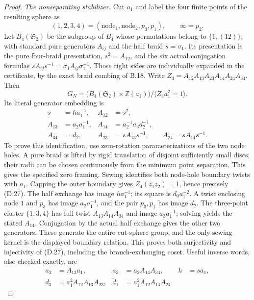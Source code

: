 \begin{proof}
\emph{The nonseparating stabilizer.}
Cut $a_1$ and label the four finite points of the resulting
sphere as
\[
         (1,2,3,4)=(\text{node}_1,\text{node}_2,p_3,p_1),
                    \qquad\infty=p_2.
\]
Let $B_4(\mathfrak S_2)$ be the subgroup of $B_4$ whose
permutations belong to $\{1,(12)\}$, with standard pure
generators $A_{ij}$ and the half braid $s=\sigma_1$.
Its presentation is the pure four-braid presentation,
$s^2=A_{12}$, and the six actual conjugation formulas
$sA_{ij}s^{-1}=\sigma_1A_{ij}\sigma_1^{-1}$.
Those right sides are individually expanded in the
certificate, by the exact braid combing of B.18.
Write
$Z_4=A_{12}A_{13}A_{23}A_{14}A_{24}A_{34}$.
Then
\[
 G_N=\bigl(B_4(\mathfrak S_2)\times\mathbb Z(a_1)\bigr)
                   /\langle Z_4a_1^2=1\rangle.          \tag{D.27}
\]
Its literal generator embedding is
\[
\begin{aligned}
 s&=h a_1^{-1},& A_{12}&=s^2,\\
 A_{13}&=a_2a_1^{-1},& A_{14}&=a_2^{-1}a_3d_2^{-1},\\
 A_{34}&=d_2,& A_{23}&=sA_{13}s^{-1},\qquad
 A_{24}=sA_{14}s^{-1}.
\end{aligned}                                                     \tag{D.28}
\]
To prove this identification, use zero-rotation
parameterizations of the two node holes.  A pure braid
is lifted by rigid translation of disjoint sufficiently
small discs; their radii can be chosen continuously from
the minimum point separation.  This gives the specified
zero framing.  Sewing identifies both node-hole boundary
twists with $a_1$.  Capping the outer boundary gives
$Z_4(z_1z_2)=1$, hence precisely (D.27).
The half exchange has image $h a_1^{-1}$; its square is
$d_0a_1^{-2}$.  A twist enclosing node $1$ and $p_3$ has
image $a_2a_1^{-1}$, and the pair $p_3,p_1$ has image
$d_2$.  The three-point cluster $\{1,3,4\}$ has full
twist $A_{13}A_{14}A_{34}$ and image $a_3a_1^{-1}$;
solving yields the stated $A_{14}$.  Conjugation by the
actual half exchange gives the other two generators.
These generate the entire cut-sphere group, and the
only sewing kernel is the displayed boundary relation.
This proves both surjectivity and injectivity of (D.27),
including the branch-exchanging coset.
Useful inverse words, also checked exactly, are
\[
\begin{aligned}
 a_2&=A_{13}a_1,&a_3&=a_2A_{14}A_{34},&h&=sa_1,\\
 d_3&=a_1^2A_{12}A_{13}A_{23},&
 \widetilde d_1&=a_1^2A_{12}A_{14}A_{24}.&&
\end{aligned}                                                     \tag{D.29}
\]


\end{proof}
